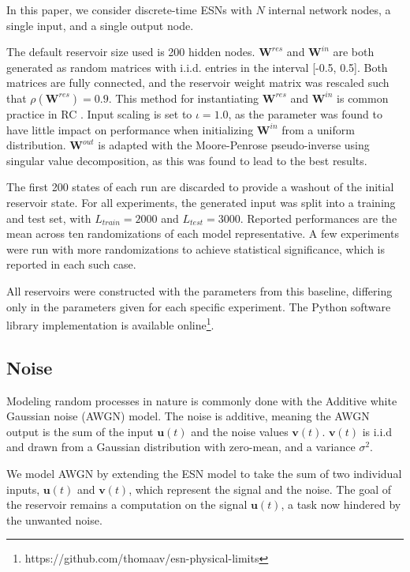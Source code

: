 In this paper, we consider discrete-time ESNs with $N$ internal network nodes, a
single input, and a single output node.

The default reservoir size used is 200 hidden nodes. $\mathbf{W}^{res}$ and
$\mathbf{W}^{in}$ are both generated as random matrices with i.i.d. entries in
the interval [-0.5, 0.5]. Both matrices are fully connected, and the reservoir
weight matrix was rescaled such that $\rho(\mathbf{W}^{res}) = 0.9$. This method
for instantiating $\mathbf{W}^{res}$ and $\mathbf{W}^{in}$ is common practice in
RC \cite{montavon_practical_2012}. Input scaling is set to $\iota = 1.0$, as the
parameter was found to have little impact on performance when initializing
$\mathbf{W}^{in}$ from a uniform distribution. $\mathbf{W}^{out}$ is adapted
with the Moore-Penrose pseudo-inverse using singular value decomposition, as
this was found to lead to the best results.

The first 200 states of each run are discarded to provide a washout of the
initial reservoir state. For all experiments, the generated input was split into
a training and test set, with $L_{train} = 2000$ and $L_{test} = 3000$. Reported
performances are the mean across ten randomizations of each model
representative. A few experiments were run with more randomizations to achieve
statistical significance, which is reported in each such case.

All reservoirs were constructed with the parameters from this baseline,
differing only in the parameters given for each specific experiment. The Python
software library implementation is available
online\footnote{https://github.com/thomaav/esn-physical-limits}.

\subsection{Noise}

Modeling random processes in nature is commonly done with the Additive white
Gaussian noise (AWGN) model. The noise is additive, meaning the AWGN output is
the sum of the input $\mathbf{u}(t)$ and the noise values
$\mathbf{v}(t)$. $\mathbf{v}(t)$ is i.i.d and drawn from a Gaussian distribution
with zero-mean, and a variance $\sigma^{2}$.

We model AWGN by extending the ESN model to take the sum of two individual
inputs, $\mathbf{u}(t)$ and $\mathbf{v}(t)$, which represent the signal and the
noise. The goal of the reservoir remains a computation on the signal
$\mathbf{u}(t)$, a task now hindered by the unwanted noise.

